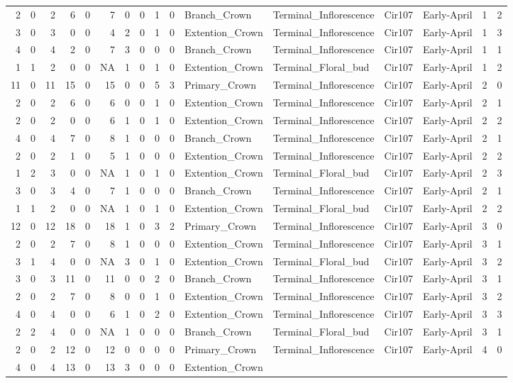 \documentclass[]{article}
\begin{document}
\begin{longtable}[]{@{}rrrrrrrrrrllllrl@{}}
2 & 0 & 2 & 6 & 0 & 7 & 0 & 0 & 1 & 0 & Branch\_Crown &
Terminal\_Inflorescence & Cir107 & Early-April & 1 & 2\tabularnewline
3 & 0 & 3 & 0 & 0 & 4 & 2 & 0 & 1 & 0 & Extention\_Crown &
Terminal\_Inflorescence & Cir107 & Early-April & 1 & 3\tabularnewline
4 & 0 & 4 & 2 & 0 & 7 & 3 & 0 & 0 & 0 & Branch\_Crown &
Terminal\_Inflorescence & Cir107 & Early-April & 1 & 1\tabularnewline
1 & 1 & 2 & 0 & 0 & NA & 1 & 0 & 1 & 0 & Extention\_Crown &
Terminal\_Floral\_bud & Cir107 & Early-April & 1 & 2\tabularnewline
11 & 0 & 11 & 15 & 0 & 15 & 0 & 0 & 5 & 3 & Primary\_Crown &
Terminal\_Inflorescence & Cir107 & Early-April & 2 & 0\tabularnewline
2 & 0 & 2 & 6 & 0 & 6 & 0 & 0 & 1 & 0 & Extention\_Crown &
Terminal\_Inflorescence & Cir107 & Early-April & 2 & 1\tabularnewline
2 & 0 & 2 & 0 & 0 & 6 & 1 & 0 & 1 & 0 & Extention\_Crown &
Terminal\_Inflorescence & Cir107 & Early-April & 2 & 2\tabularnewline
4 & 0 & 4 & 7 & 0 & 8 & 1 & 0 & 0 & 0 & Branch\_Crown &
Terminal\_Inflorescence & Cir107 & Early-April & 2 & 1\tabularnewline
2 & 0 & 2 & 1 & 0 & 5 & 1 & 0 & 0 & 0 & Extention\_Crown &
Terminal\_Inflorescence & Cir107 & Early-April & 2 & 2\tabularnewline
1 & 2 & 3 & 0 & 0 & NA & 1 & 0 & 1 & 0 & Extention\_Crown &
Terminal\_Floral\_bud & Cir107 & Early-April & 2 & 3\tabularnewline
3 & 0 & 3 & 4 & 0 & 7 & 1 & 0 & 0 & 0 & Branch\_Crown &
Terminal\_Inflorescence & Cir107 & Early-April & 2 & 1\tabularnewline
1 & 1 & 2 & 0 & 0 & NA & 1 & 0 & 1 & 0 & Extention\_Crown &
Terminal\_Floral\_bud & Cir107 & Early-April & 2 & 2\tabularnewline
12 & 0 & 12 & 18 & 0 & 18 & 1 & 0 & 3 & 2 & Primary\_Crown &
Terminal\_Inflorescence & Cir107 & Early-April & 3 & 0\tabularnewline
2 & 0 & 2 & 7 & 0 & 8 & 1 & 0 & 0 & 0 & Extention\_Crown &
Terminal\_Inflorescence & Cir107 & Early-April & 3 & 1\tabularnewline
3 & 1 & 4 & 0 & 0 & NA & 3 & 0 & 1 & 0 & Extention\_Crown &
Terminal\_Floral\_bud & Cir107 & Early-April & 3 & 2\tabularnewline
3 & 0 & 3 & 11 & 0 & 11 & 0 & 0 & 2 & 0 & Branch\_Crown &
Terminal\_Inflorescence & Cir107 & Early-April & 3 & 1\tabularnewline
2 & 0 & 2 & 7 & 0 & 8 & 0 & 0 & 1 & 0 & Extention\_Crown &
Terminal\_Inflorescence & Cir107 & Early-April & 3 & 2\tabularnewline
4 & 0 & 4 & 0 & 0 & 6 & 1 & 0 & 2 & 0 & Extention\_Crown &
Terminal\_Inflorescence & Cir107 & Early-April & 3 & 3\tabularnewline
2 & 2 & 4 & 0 & 0 & NA & 1 & 0 & 0 & 0 & Branch\_Crown &
Terminal\_Floral\_bud & Cir107 & Early-April & 3 & 1\tabularnewline
2 & 0 & 2 & 12 & 0 & 12 & 0 & 0 & 0 & 0 & Primary\_Crown &
Terminal\_Inflorescence & Cir107 & Early-April & 4 & 0\tabularnewline
4 & 0 & 4 & 13 & 0 & 13 & 3 & 0 & 0 & 0 & Extention\_Crown &

\end{longtable}
\end{document}
